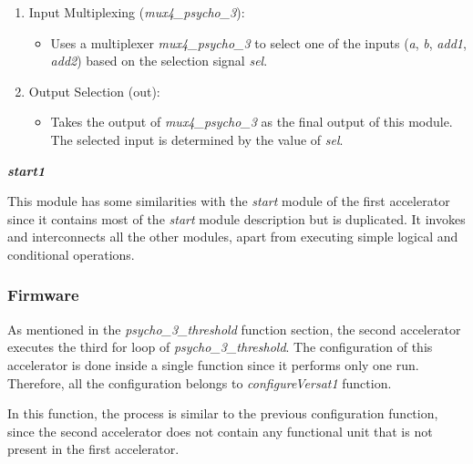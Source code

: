 \begin{enumerate}

\item Input Multiplexing (\textit{mux4\_psycho\_3}):
\begin{itemize}
\item Uses a multiplexer \textit{mux4\_psycho\_3} to select one of the inputs (\textit{a}, \textit{b}, \textit{add1}, \textit{add2}) based on the selection signal \textit{sel}.
\end{itemize}

\item Output Selection (out):
\begin{itemize}
\item Takes the output of \textit{mux4\_psycho\_3} as the final output of this module. The selected input is determined by the value of \textit{sel}.
\end{itemize}

\end{enumerate}

\vspace{0.5cm}

\textbf{\textit{start1}}

This module has some similarities with the \textit{start} module of the first accelerator since it contains most of the \textit{start} module description but is duplicated.
It invokes and interconnects all the other modules, apart from executing simple logical and conditional operations.

\subsubsection{Firmware}

As mentioned in the \textit{psycho\_3\_threshold} function section, the second accelerator executes the third for loop of \textit{psycho\_3\_threshold}.
The configuration of this accelerator is done inside a single function since it performs only one run. Therefore, all the configuration belongs to \textit{configureVersat1} function.

In this function, the process is similar to the previous configuration function, since the second accelerator does not contain any functional unit that is not present in the first accelerator.
